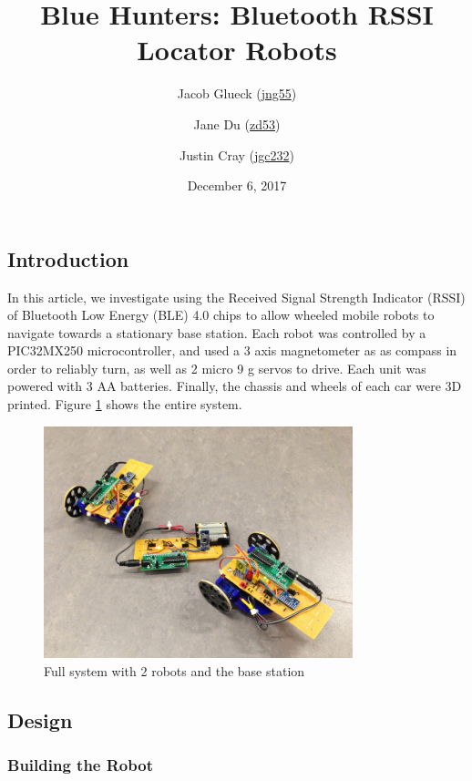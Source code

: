 \documentclass[]{article}
\title{Blue Hunters: Bluetooth RSSI Locator Robots}
\author{Jacob Glueck (\href{mailto:jng55@cornell.edu}{jng55}) \and Jane Du (\href{mailto:zd53@cornell.edu}{zd53}) \and Justin Cray (\href{mailto:jgc232@cornell.edu}{jgc232})}
\date{December 6, 2017}
\begin{document}
\maketitle

\hypertarget{introduction}{%
\subsection{Introduction}\label{introduction}}


In this article, we investigate using the Received Signal Strength Indicator (RSSI) of Bluetooth Low Energy (BLE) 4.0 chips to allow wheeled mobile robots to navigate towards a stationary base station.
Each robot was controlled by a PIC32MX250 microcontroller, and used a 3 axis magnetometer as as compass in order to reliably turn, as well as 2 micro 9 g servos to drive.
Each unit was powered with 3 AA batteries.
Finally, the chassis and wheels of each car were 3D printed.
Figure \ref{fig:robotsystem} shows the entire system.

\begin{figure}
  \centering
  \includegraphics[width=0.8\textwidth]{full_system.jpg}
  \caption{Full system with 2 robots and the base station}
  \label{fig:robotsystem}
\end{figure}

\subsection{Design}

\subsubsection{Building the Robot}
\end{document}
